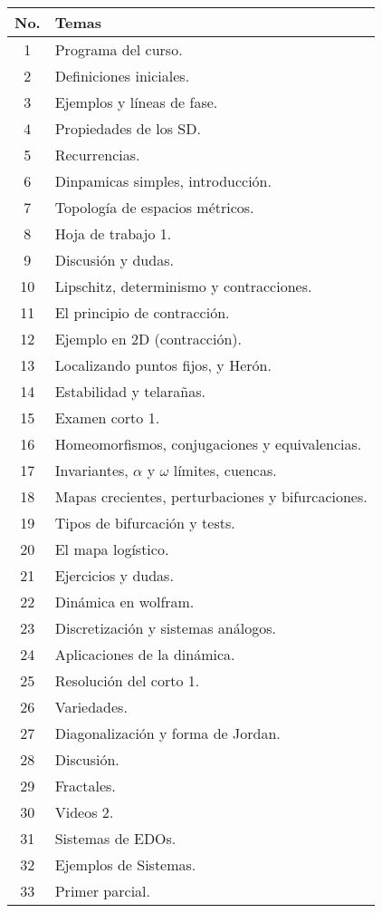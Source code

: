 \vspace{1cm}


\begin{table}[H]
	\centering
	\begin{tabular}{||c|p{13cm}||}
		\hline
		\hline
			No. & Temas \\
		\hline
		\hline
			1 & Programa del curso. \\
			2 & Definiciones iniciales. \\
			3 & Ejemplos y líneas de fase. \\
			4 & Propiedades de los SD. \\
			5 & Recurrencias. \\
			6 & Dinpamicas simples, introducción. \\
			7 & Topología de espacios métricos. \\
			8 & Hoja de trabajo 1. \\
			9 & Discusión y dudas. \\
			10 & Lipschitz, determinismo y contracciones. \\
			11 & El principio de contracción. \\
			12 & Ejemplo en 2D (contracción). \\
			13 & Localizando puntos fijos, y Herón. \\
			14 & Estabilidad y telarañas. \\
			15 & Examen corto 1. \\
			16 & Homeomorfismos, conjugaciones y equivalencias. \\
			17 & Invariantes, $\alpha$ y $\omega$ límites, cuencas. \\
			18 & Mapas crecientes, perturbaciones y bifurcaciones. \\
			19 & Tipos de bifurcación y tests. \\
			20 & El mapa logístico. \\
			21 & Ejercicios y dudas. \\
			22 & Dinámica en wolfram. \\
			23 & Discretización y sistemas análogos. \\
			24 & Aplicaciones de la dinámica. \\
			25 & Resolución del corto 1. \\
			26 & Variedades. \\
			27 & Diagonalización y forma de Jordan. \\
			28 & Discusión. \\
			29 & Fractales. \\
			30 & Videos 2. \\
			31 & Sistemas de EDOs. \\
			32 & Ejemplos de Sistemas. \\
			33 & Primer parcial. \\
		\hline
		\hline
	\end{tabular}
\end{table}



